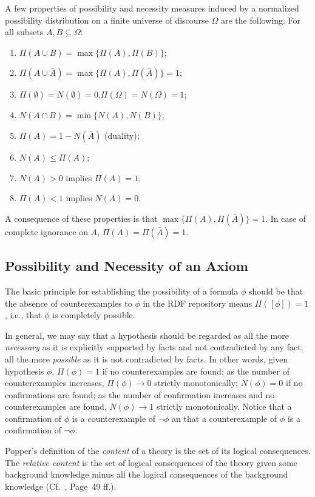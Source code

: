 \documentclass[a4paper]{article}
\newcounter{ex}
\begin{document}
A few properties of possibility and necessity measures 
induced by a normalized possibility distribution on a finite universe of
discourse $\Omega$ are the following. For all subsets $A, B\subseteq \Omega$:
\begin{enumerate}
  \item $\Pi(A \cup B) = \max\{\Pi(A), \Pi(B)\}$;
  \item $\Pi(A \cup \bar A) = \max\{\Pi(A), \Pi(\bar A)\}=1$;
  \item $\Pi(\emptyset) = N(\emptyset) = 0$,\quad $\Pi(\Omega) = N(\Omega) = 1$;
  \item $N(A \cap B) = \min\{N(A), N(B)\}$;
  \item $\Pi(A) = 1 - N(\bar{A})$ (duality);
  \item $N(A) \leq \Pi(A)$;
  \item $N(A) > 0$ implies $\Pi(A) = 1$;
  \item $\Pi(A) < 1$ implies $N(A) = 0$.
\end{enumerate}
A consequence of these properties is that $\max\{\Pi(A), \Pi(\bar{A})\} = 1$.
In case of complete ignorance on $A$, $\Pi(A) = \Pi(\bar{A}) = 1$.

\subsection{Possibility and Necessity of an Axiom}

The basic principle for establishing the possibility of a formula $\phi$ should be
that the absence of counterexamples to $\phi$ in the RDF repository means $\Pi([\phi]) = 1$,
i.e., that $\phi$ is completely possible.

In general, we may say that a hypothesis should be regarded as all the more
\emph{necessary} as it is explicitly supported by facts and not contradicted by any fact;
all the more \emph{possible} as it is not contradicted by facts.
In other words, given hypothesis $\phi$, $\Pi(\phi) = 1$ if no counterexamples are found;
as the number of counterexamples increases, $\Pi(\phi) \to 0$ strictly monotonically;
$N(\phi) = 0$ if no confirmations are found; as the number of confirmation increases
and no counterexamples are found, $N(\phi) \to 1$ strictly monotonically.
Notice that a confirmation of $\phi$ is a counterexample of $\neg\phi$
an that a counterexample of $\phi$ is a confirmation of $\neg\phi$.

Popper's definition of the \emph{content} of a theory is the set of its logical consequences.
The \emph{relative content} is the set of logical consequences of the theory
given some background knowledge minus all the logical consequences of the
background knowledge (Cf.~\cite{Popper1972}, Page~49 ff.).
\end{document}
